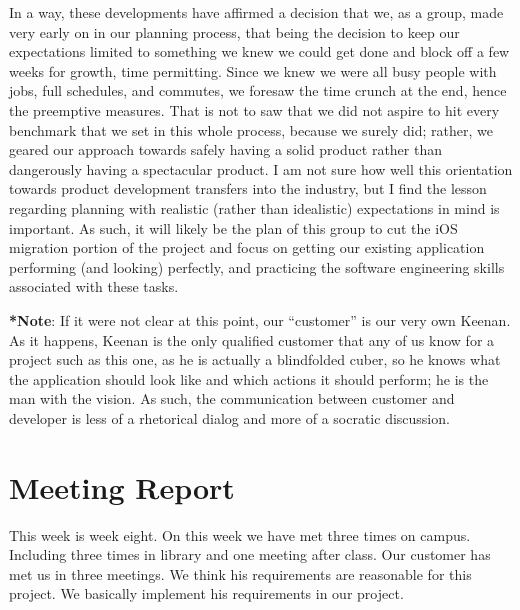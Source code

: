 \documentclass[12pt]{article}
\begin{document}
\par In a way, these developments have affirmed a decision that we, as a group, made very early on in our planning process, that being the decision to keep our expectations limited to something we knew we could get done and block off a few weeks for growth, time permitting. Since we knew we were all busy people with jobs, full schedules, and commutes, we foresaw the time crunch at the end, hence the preemptive measures. That is not to saw that we did not aspire to hit every benchmark that we set in this whole process, because we surely did; rather, we geared our approach towards safely having a solid product rather than dangerously having a  spectacular product. I am not sure how well this orientation towards product development transfers into the industry, but I find the lesson regarding planning with realistic (rather than idealistic) expectations in mind is important. As such, it will likely be the plan of this group to cut the iOS migration portion of the project and focus on getting our existing application performing (and looking) perfectly, and practicing the software engineering skills associated with these tasks. \\

\par \textbf{*Note}: If it were not clear at this point, our “customer” is our very own Keenan. As it happens, Keenan is the only qualified customer that any of us know for a project such as this one, as he is actually a blindfolded cuber, so he knows what the application should look like and which actions it should perform; he is the man with the vision. As such, the communication between customer and developer is less of a rhetorical dialog and more of a socratic discussion. \\

\section{Meeting Report}

\par This week is week eight. On this week we have met three times on campus. Including three times in library and one meeting after class. Our customer has met us in three meetings. We think his requirements are reasonable for this project. We basically implement his requirements in our project. \\
\end{document}
